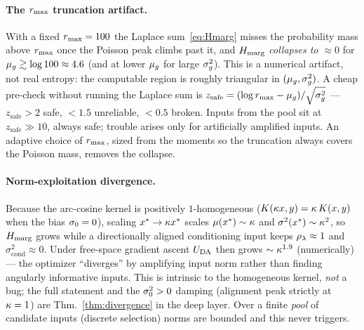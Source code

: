 \paragraph{The $r_{\max}$ truncation artifact.}
With a fixed $r_{\max}=100$ the Laplace sum~\eqref{eq:Hmarg} misses the probability
mass above $r_{\max}$ once the Poisson peak climbs past it, and $H_{\mathrm{marg}}$
\emph{collapses to $\approx0$} for $\mu_{g}\gtrsim\log100\approx4.6$ (and at lower
$\mu_{g}$ for large $\sigma_{g}^{2}$). This is a numerical artifact, not real entropy: the
computable region is roughly triangular in $(\mu_{g},\sigma_{g}^{2})$. A cheap pre-check
without running the Laplace sum is $z_{\mathrm{safe}}=(\log r_{\max}-\mu_{g})/\sqrt{\sigma_{g}^{2}}$
--- $z_{\mathrm{safe}}>2$ safe, $<1.5$ unreliable, $<0.5$ broken. Inputs from the
pool sit at $z_{\mathrm{safe}}\gg10$, always safe; trouble arises only for
artificially amplified inputs. An adaptive choice of $r_{\max}$, sized from the moments
so the truncation always covers the Poisson mass, removes the collapse.

\paragraph{Norm-exploitation divergence.}
Because the arc-cosine kernel is positively $1$-homogeneous
($K(\kappa x,y)=\kappa\,K(x,y)$ when the bias $\sigma_{0}=0$), scaling
$x^{*}\to\kappa x^{*}$ scales $\mu(x^{*})\sim\kappa$ and $\sigma^{2}(x^{*})\sim\kappa^{2}$,
so $H_{\mathrm{marg}}$ grows while a directionally aligned conditioning input keeps
$\rho_{\lambda}\approx1$ and $\sigma^{2}_{\mathrm{cond}}\approx0$. Under free-space gradient
ascent $U_{\mathrm{DA}}$ then grows $\sim\kappa^{1.9}$ (numerically) --- the optimizer
``diverges'' by amplifying input norm rather than finding angularly informative
inputs. This is intrinsic to the homogeneous kernel, \emph{not} a bug; the full
statement and the $\sigma_{0}^{2}>0$ damping (alignment peak strictly at $\kappa=1$) are
Thm.~\ref{thm:divergence} in the deep layer. Over a finite \emph{pool} of candidate
inputs (discrete selection) norms are bounded and this never triggers.

